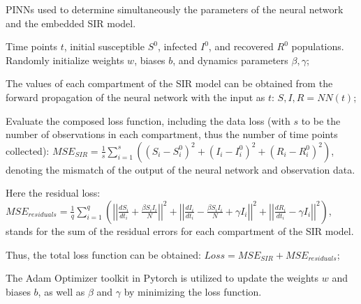 \documentclass[12pt, letterpaper]{report}
\begin{document}
\begin{algorithm}
\caption{PINNs used to determine simultaneously the parameters of the neural network and the embedded SIR model.}
\begin{algorithmic}[1]

\Require Time points $t$, initial susceptible $S^0$, infected $I^0$, and recovered $R^0$ populations.
\State Randomly initialize weights $w$, biases $b$, and dynamics parameters $\beta, \gamma$;

    \State The values of each compartment of the SIR model can be obtained from the forward propagation of the neural network with the input as $t$:
    \State $S, I, R = NN(t)$;
    
    \State Evaluate the composed loss function, including the data loss (with $s$ to be the number of observations in each compartment, thus the number of time points collected):
    \State $MSE_{SIR} = \frac{1}{s}\sum_{i=1}^{s} \left((S_i - S_i^0)^2 + (I_i - I_i^0)^2 + (R_i - R_i^0)^2\right)$, denoting the mismatch of the output of the neural network and observation data.
    
    \State Here the residual loss:
    \State $MSE_{residuals} = \frac{1}{q}\sum_{i=1}^{q} \left(\left|\left|\frac{dS_i}{dt_i} + \frac{\beta S_i I_i}{N}\right|\right|^2 + \left|\left|\frac{dI_i}{dt_i} - \frac{\beta S_i I_i}{N} + \gamma I_i\right|\right|^2 + \left|\left|\frac{dR_i}{dt_i} - \gamma I_i\right|\right|^2\right)$,
    \State stands for the sum of the residual errors for each compartment of the SIR model.
    
    \State Thus, the total loss function can be obtained:
    \State $Loss = MSE_{SIR} + MSE_{residuals}$;
    
    \State The Adam Optimizer toolkit in Pytorch is utilized to update the weights $w$ and biases $b$, as well as $\beta$ and $\gamma$ by minimizing the loss function.
\EndFor

\end{algorithmic}
\end{algorithm}
\end{document}
